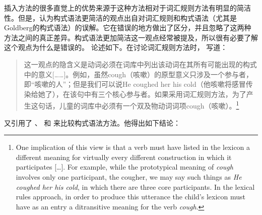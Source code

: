     插入方法的很多直觉上的优势来源于这种方法相对于词汇规则方法有明显的简洁性。但是，认为构式语法更简洁的观点出自对词汇规则和构式语法（尤其是Goldberg\citeyearpar{Goldberg95a,Goldberg2006a}的构式语法）的误解。它在错误的地方做出了区分，并且忽略了这两种方法之间的真正差异。构式语法更加简洁这一观点经常被提及，所以很有必要了解这个观点为什么是错误的。
     \citet{Tomasello2003a}论述如下。在讨论词汇规则方法时， \citet[]{Tomasello2003a}写道：   

\begin{quotation}
这一观点的隐含义是动词必须在词库中列出该动词在其所有可能出现的构式中的意义[……]。例如，虽然cough（咳嗽）的原型意义只涉及一个参与者，即“咳嗽的人”；但是我们可以说He coughed her his cold（他咳嗽将感冒传染给她了），在该句中有三个核心参与者。如果采用词汇规则方法，为了产生这句话，儿童的词库中必须有一个双及物动词词项cough（咳嗽）。\citep[]{Tomasello2003a}\footnote{%
One implication of this view is that a verb must have listed in the lexicon a different meaning for
virtually every different construction in which it participates [\ldots].  For example, while the
prototypical meaning of \emph{cough} involves only one participant, the cougher, we may say such
things as \emph{He coughed her his cold}, in which there are three core participants.  In the
lexical rules approach, in order to produce this utterance the child's lexicon must have as an entry
a ditransitive meaning for the verb \emph{cough}.
}
\end{quotation}
 \citet[]{Tomasello2003a}又引用了 \citet{FKoC88a}、 \citet{Goldberg95a}和 \citet{Croft2001a}来比较构式语法方法。他得出如下结论：

